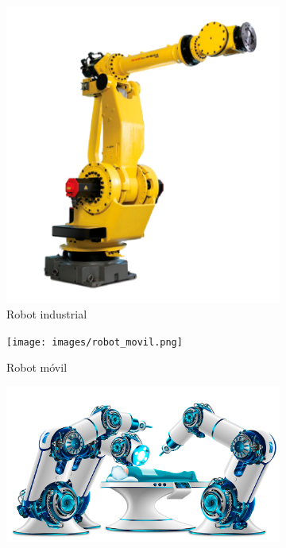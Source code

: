 \documentclass{report}
\begin{document}
\begin{enumerate}
\begin{itemize}
\renewcommand{\figurename}{Figura}		
\begin{figure}[h]
\centering
  \begin{subfigure}[b]{0.25\textwidth}
    \includegraphics[width=\textwidth, height=\textwidth]{images/robot_industrial.png}
    \caption{Robot industrial}
    \label{fig:f1}
  \end{subfigure}
    \begin{subfigure}[b]{0.25\textwidth}
    \texttt{[image: images/robot\_movil.png]}
    \caption{Robot móvil}
    \label{fig:f2}
  	\end{subfigure}
  	\begin{subfigure}[b]{0.25\textwidth}
    \includegraphics[width=1.3\textwidth, height=\textwidth]{images/robot_medico.png}

\end{subfigure}
\end{figure}
\end{itemize}
\end{enumerate}
\end{document}
